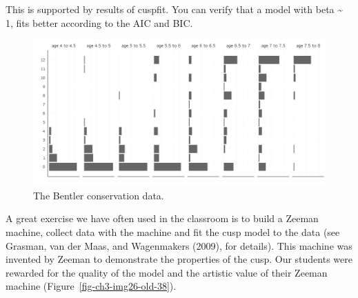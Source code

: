 \documentclass[
  a4paper,
  DIV=11,
  numbers=noendperiod,
  oneside]{scrreprt}
\begin{document}
This is supported by results of cuspfit. You can verify that a model
with beta \textasciitilde{} 1, fits better according to the AIC and BIC.

\begin{figure}

{\centering \includegraphics{media/ch3/fig-ch3-img25-old-37.jpg}

}

\caption{\label{fig-ch3-img25-old-37}The Bentler conservation data.}

\end{figure}

A great exercise we have often used in the classroom is to build a
Zeeman machine, collect data with the machine and fit the cusp model to
the data (see Grasman, van der Maas, and Wagenmakers (2009), for
details). This machine was invented by Zeeman to demonstrate the
properties of the cusp. Our students were rewarded for the quality of
the model and the artistic value of their Zeeman machine
(Figure~\ref{fig-ch3-img26-old-38}).
\end{document}
